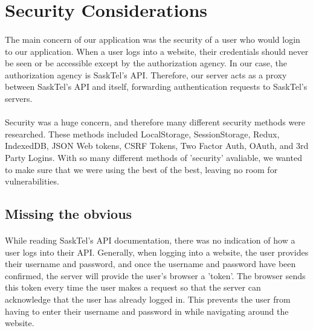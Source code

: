 \documentclass[12pt]{article}
\begin{document}
\newpage

\section{Security Considerations}
\paragraph{}
	The main concern of our application was the security of a user who would login to our application. When a user logs into a website, their credentials should never be seen or be accessible except by the authorization agency. In our case, the authorization agency is SaskTel's API. Therefore, our server acts as a proxy between SaskTel's API and itself, forwarding authentication requests to SaskTel's servers.
\paragraph{}	
	Security was a huge concern, and therefore many different security methods were researched. These methods included LocalStorage, SessionStorage, Redux, IndexedDB, JSON Web tokens, CSRF Tokens, Two Factor Auth, OAuth, and 3rd Party Logins. With so many different methods of 'security' avaliable, we wanted to make sure that we were using the best of the best, leaving no room for vulnerabilities.

\subsection{Missing the obvious}
\paragraph{}	
	While reading SaskTel's API documentation, there was no indication of how a user logs into their API. Generally, when logging into a website, the user provides their username and password, and once the username and password have been confirmed, the server will provide the user's browser a 'token'. The browser sends this token every time the user makes a request so that the server can acknowledge that the user has already logged in. This prevents the user from having to enter their username and password in while navigating around the website. 
\end{document}
